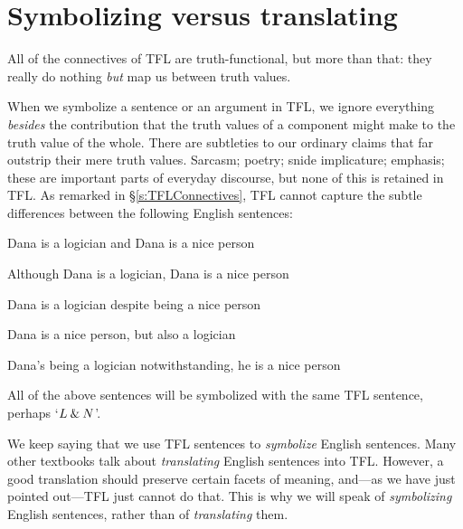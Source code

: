 
\section{Symbolizing versus translating}
All of the connectives of TFL are truth-functional, but more than that: they really do nothing \emph{but} map us between truth values.

When we symbolize a sentence or an argument in TFL, we ignore everything \emph{besides} the contribution that the truth values of a component might make to the truth value of the whole. There are subtleties to our ordinary claims that far outstrip their mere truth values. Sarcasm; poetry; snide implicature; emphasis; these are important parts of everyday discourse, but none of this is retained in TFL. As remarked in \S\ref{s:TFLConnectives}, TFL cannot capture the subtle differences between the following English sentences:
	\begin{earg}
		\item Dana is a logician and Dana is a nice person
		\item Although Dana is a logician, Dana is a nice person
		\item Dana is a logician despite being a nice person
		\item Dana is a nice person, but also a logician
		\item Dana's being a logician notwithstanding, he is a nice person
	\end{earg}
All of the above sentences will be symbolized with the same TFL sentence, perhaps `$L \mathbin{\&} N$'.

We keep saying that we use TFL sentences to \emph{symbolize} English sentences. Many other textbooks talk about \emph{translating} English sentences into TFL. However, a good translation should preserve certain facets of meaning, and---as we have just pointed out---TFL just cannot do that. This is why we will speak of \emph{symbolizing} English sentences, rather than of \emph{translating} them.

